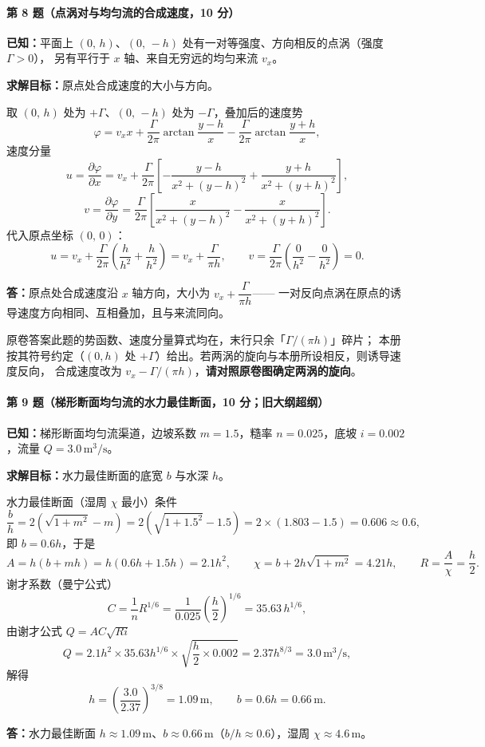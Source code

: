 \paragraph{第 8 题（点涡对与均匀流的合成速度，10 分）}
\begin{jie}
\textbf{已知：}平面上 $(0,\,h)$、$(0,\,-h)$ 处有一对等强度、方向相反的点涡（强度 $\Gamma>0$），
另有平行于 $x$ 轴、来自无穷远的均匀来流 $v_x$。

\textbf{求解目标：}原点处合成速度的大小与方向。

取 $(0,\,h)$ 处为 $+\Gamma$、$(0,\,-h)$ 处为 $-\Gamma$，叠加后的速度势
\[
\varphi=v_xx+\frac{\Gamma}{2\pi}\arctan\frac{y-h}{x}-\frac{\Gamma}{2\pi}\arctan\frac{y+h}{x},
\]
速度分量
\[
u=\frac{\partial\varphi}{\partial x}
=v_x+\frac{\Gamma}{2\pi}\left[-\frac{y-h}{x^{2}+(y-h)^{2}}+\frac{y+h}{x^{2}+(y+h)^{2}}\right],
\]
\[
v=\frac{\partial\varphi}{\partial y}
=\frac{\Gamma}{2\pi}\left[\frac{x}{x^{2}+(y-h)^{2}}-\frac{x}{x^{2}+(y+h)^{2}}\right].
\]
代入原点坐标 $(0,\,0)$：
\[
u=v_x+\frac{\Gamma}{2\pi}\left(\frac{h}{h^{2}}+\frac{h}{h^{2}}\right)=v_x+\frac{\Gamma}{\pi h},
\qquad
v=\frac{\Gamma}{2\pi}\left(\frac{0}{h^{2}}-\frac{0}{h^{2}}\right)=0 .
\]

\textbf{答：}原点处合成速度沿 $x$ 轴方向，大小为 $v_x+\dfrac{\Gamma}{\pi h}$——
一对反向点涡在原点的诱导速度方向相同、互相叠加，且与来流同向。
\end{jie}

\begin{tishi}
原卷答案此题的势函数、速度分量算式均在，末行只余「$\Gamma/(\pi h)$」碎片；
本册按其符号约定（$(0,h)$ 处 $+\Gamma$）给出。若两涡的旋向与本册所设相反，则诱导速度反向，
合成速度改为 $v_x-\Gamma/(\pi h)$，\textbf{请对照原卷图确定两涡的旋向}。
\end{tishi}

\paragraph{第 9 题（梯形断面均匀流的水力最佳断面，10 分；旧大纲超纲）}
\begin{jie}
\textbf{已知：}梯形断面均匀流渠道，边坡系数 $m=1.5$，糙率 $n=0.025$，底坡 $i=0.002$，流量 $Q=3.0\,\mathrm{m^3/s}$。

\textbf{求解目标：}水力最佳断面的底宽 $b$ 与水深 $h$。

水力最佳断面（湿周 $\chi$ 最小）条件
\[
\frac bh=2\left(\sqrt{1+m^{2}}-m\right)=2\left(\sqrt{1+1.5^{2}}-1.5\right)
=2\times(1.803-1.5)=0.606\approx0.6 ,
\]
即 $b=0.6h$，于是
\[
A=h(b+mh)=h(0.6h+1.5h)=2.1h^{2},
\qquad
\chi=b+2h\sqrt{1+m^{2}}=4.21h,
\qquad
R=\frac A\chi=\frac h2 .
\]
谢才系数（曼宁公式）
\[
C=\frac1nR^{1/6}=\frac{1}{0.025}\left(\frac h2\right)^{1/6}=35.63\,h^{1/6},
\]
由谢才公式 $Q=AC\sqrt{Ri}$
\[
Q=2.1h^{2}\times35.63h^{1/6}\times\sqrt{\frac h2\times0.002}
=2.37h^{8/3}=3.0\,\mathrm{m^3/s},
\]
解得
\[
h=\left(\frac{3.0}{2.37}\right)^{3/8}=1.09\,\mathrm{m},
\qquad
b=0.6h=0.66\,\mathrm{m}.
\]

\textbf{答：}水力最佳断面 $h\approx1.09\,\mathrm{m}$、$b\approx0.66\,\mathrm{m}$（$b/h\approx0.6$），湿周 $\chi\approx4.6\,\mathrm{m}$。
\end{jie}


